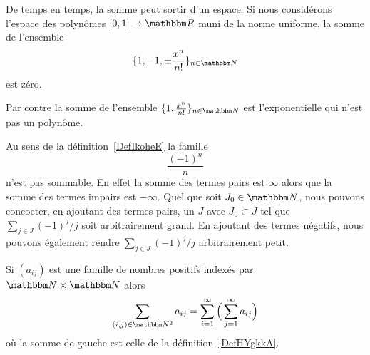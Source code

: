 \begin{example}
    De temps en temps, la somme peut sortir d'un espace. Si nous considérons l'espace des polynômes \( \mathopen[ 0 , 1 \mathclose]\to \eR\) muni de la norme uniforme, la somme de l'ensemble
    \begin{equation}
        \{ 1,-1,\pm\frac{ x^n }{ n! } \}_{n\in \eN}
    \end{equation}
    est zéro.

    Par contre la somme de l'ensemble \( \{ 1,\frac{ x^n }{ n! } \}_{n\in \eN}\) est l'exponentielle qui n'est pas un polynôme.
\end{example}

\begin{example}
    Au sens de la définition~\ref{DefIkoheE} la famille
    \begin{equation}
        \frac{ (-1)^n }{ n }
    \end{equation}
    n'est pas sommable. En effet la somme des termes pairs est \( \infty\) alors que la somme des termes impairs est \( -\infty\). Quel que soit \( J_0\in \eN\), nous pouvons concocter, en ajoutant des termes pairs, un \( J\) avec \( J_0\subset J\) tel que \( \sum_{j\in J}(-1)^j/j\) soit arbitrairement grand. En ajoutant des termes négatifs, nous pouvons également rendre \( \sum_{j\in J}(-1)^j/j\) arbitrairement petit.
\end{example}

\begin{proposition} \label{PropVQCooYiWTs}
    Si \( (a_{ij})\) est une famille de nombres positifs indexés par \( \eN\times \eN\) alors
    \begin{equation}
        \sum_{(i,j)\in \eN^2}a_{ij}=\sum_{i=1}^{\infty}\Big( \sum_{j=1}^{\infty}a_{ij} \Big)
    \end{equation}
    où la somme de gauche est celle de la définition~\ref{DefHYgkkA}.
\end{proposition}

